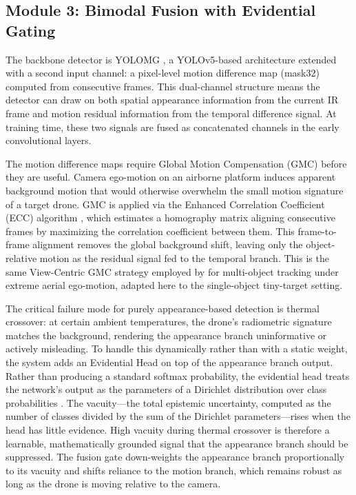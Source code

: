 \documentclass[nolinenumbering]{thesisdesign}
\begin{document}
\subsection{Module 3: Bimodal Fusion with Evidential Gating}
\label{sec:fusion}

The backbone detector is YOLOMG \citep{guo_yolomg_2025}, a YOLOv5-based architecture extended with a second input channel: a pixel-level motion difference map (mask32) computed from consecutive frames. This dual-channel structure means the detector can draw on both spatial appearance information from the current IR frame and motion residual information from the temporal difference signal. At training time, these two signals are fused as concatenated channels in the early convolutional layers.

The motion difference maps require Global Motion Compensation (GMC) before they are useful. Camera ego-motion on an airborne platform induces apparent background motion that would otherwise overwhelm the small motion signature of a target drone. GMC is applied via the Enhanced Correlation Coefficient (ECC) algorithm \citep{evangelidis2008parametric}, which estimates a homography matrix aligning consecutive frames by maximizing the correlation coefficient between them. This frame-to-frame alignment removes the global background shift, leaving only the object-relative motion as the residual signal fed to the temporal branch. This is the same View-Centric GMC strategy employed by \citet{ji2026viewcentric} for multi-object tracking under extreme aerial ego-motion, adapted here to the single-object tiny-target setting.

The critical failure mode for purely appearance-based detection is thermal crossover: at certain ambient temperatures, the drone's radiometric signature matches the background, rendering the appearance branch uninformative or actively misleading. To handle this dynamically rather than with a static weight, the system adds an Evidential Head on top of the appearance branch output. Rather than producing a standard softmax probability, the evidential head treats the network's output as the parameters of a Dirichlet distribution over class probabilities \citep{sensoy2018evidential}. The vacuity---the total epistemic uncertainty, computed as the number of classes divided by the sum of the Dirichlet parameters---rises when the head has little evidence. High vacuity during thermal crossover is therefore a learnable, mathematically grounded signal that the appearance branch should be suppressed. The fusion gate down-weights the appearance branch proportionally to its vacuity and shifts reliance to the motion branch, which remains robust as long as the drone is moving relative to the camera.
\end{document}
